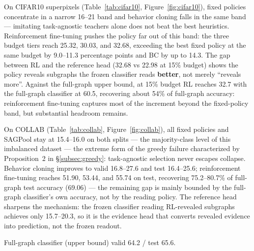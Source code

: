 \documentclass{article}
\begin{document}
On CIFAR10 superpixels (Table~\ref{tab:cifar10}, Figure~\ref{fig:cifar10}), fixed policies concentrate in a narrow 16--21 band and behavior cloning falls in the same band --- imitating task-agnostic teachers alone does not beat the best heuristics. Reinforcement fine-tuning pushes the policy far out of this band: the three budget tiers reach 25.32, 30.03, and 32.68, exceeding the best fixed policy at the same budget by 9.0--11.3 percentage points and BC by up to 14.3. The gap between RL and the reference head (32.68 vs 22.98 at 15\% budget) shows the policy reveals subgraphs the frozen classifier reads \textbf{better}, not merely ``reveals more''. Against the full-graph upper bound, at 15\% budget RL reaches 32.7 with the full-graph classifier at 60.5, recovering about 54\% of full-graph accuracy: reinforcement fine-tuning captures most of the increment beyond the fixed-policy band, but substantial headroom remains.

On COLLAB (Table~\ref{tab:collab}, Figure~\ref{fig:collab}), all fixed policies and SAGPool stay at 15.4--16.0 on both splits --- the majority-class level of this imbalanced dataset --- the extreme form of the greedy failure characterized by Proposition~2 in \S\ref{subsec:greedy}: task-agnostic selection never escapes collapse. Behavior cloning improves to valid 16.8--27.6 and test 16.4--25.6; reinforcement fine-tuning reaches 51.90, 53.44, and 55.74 on test, recovering 75.2--80.7\% of full-graph test accuracy (69.06) --- the remaining gap is mainly bounded by the full-graph classifier's own accuracy, not by the reading policy. The reference head sharpens the mechanism: the frozen classifier reading RL-revealed subgraphs achieves only 15.7--20.3, so it is the evidence head that converts revealed evidence into prediction, not the frozen readout.

\begin{table}[t]
\centering
\caption{OGBG-PPA, accuracy (\%), all cells validation/test. Learned policies do not yet beat the best fixed policy; BC collapses to near random.}
\label{tab:ppa}

\smallskip
{\footnotesize Full-graph classifier (upper bound) valid 64.2 / test 65.6.}
\end{table}
\end{document}
